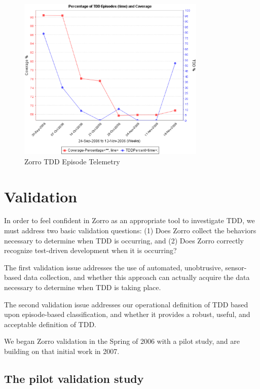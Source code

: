 \documentclass[smallextended]{svjour3}     %
\begin{document}
\begin{figure}[th]
  \center
  \includegraphics[width=0.80\textwidth]{zorro-tdd-coverage-2.eps}
  \caption{Zorro TDD Episode Telemetry}
  \label{fig:Analysis-Telemetry}
\end{figure} 


\section{Validation}
\label{sec:validation}

In order to feel confident in Zorro as an appropriate tool to investigate
TDD, we must address two basic validation questions: (1) Does Zorro collect
the behaviors necessary to determine when TDD is occurring, and (2) Does
Zorro correctly recognize test-driven development when it is occurring?

The first validation issue addresses the use of automated, unobtrusive,
sensor-based data collection, and whether this approach can actually
acquire the data necessary to determine when TDD is taking place.

The second validation issue addresses our operational definition of TDD
based upon episode-based classification, and whether it provides a robust,
useful, and acceptable definition of TDD.

We began Zorro validation in the Spring of 2006 with a pilot study, and 
are building on that initial work in 2007.

\subsection{The pilot validation study}
\end{document}
